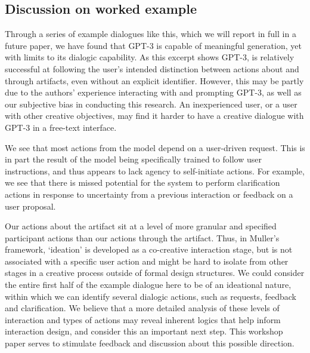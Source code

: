 \documentclass[acmlarge, nonacm, screen]{acmart} %
\begin{document}
\subsection{Discussion on worked example}

Through a series of example dialogues like this, which we will report in full in a future paper, we have found that GPT-3 is capable of meaningful generation, yet with limits to its dialogic capability. As this excerpt shows GPT-3, is relatively successful at following the user's intended distinction between actions about and through artifacts, even without an explicit identifier. However, this may be partly due to the authors' experience interacting with and prompting GPT-3, as well as our subjective bias in conducting this research. An inexperienced user, or a user with other creative objectives, may find it harder to have a creative dialogue with GPT-3 in a free-text interface. 

We see that most actions from the model depend on a user-driven request. This is in part the result of the model being specifically trained to follow user instructions, and thus appears to lack agency to self-initiate actions. For example, we see that there is missed potential for the system to perform clarification actions in response to uncertainty from a previous interaction or feedback on a user proposal.

Our actions about the artifact sit at a level of more granular and specified participant actions than our actions through the artifact. Thus, in Muller's \cite{mullermixed} framework, `ideation' is developed as a co-creative interaction stage, but is not associated with a specific user action and might be hard to isolate from other stages in a creative process outside of formal design structures. We could consider the entire first half of the example dialogue here to be of an ideational nature, within which we can identify several dialogic actions, such as requests, feedback and clarification. We believe that a more detailed analysis of these levels of interaction and types of actions may reveal inherent logics that help inform interaction design, and consider this an important next step. This workshop paper serves to stimulate feedback and discussion about this possible direction.
\end{document}
